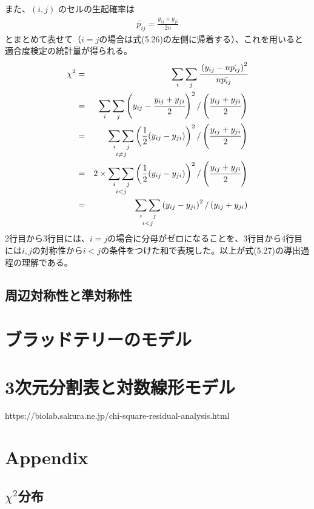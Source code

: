 \documentclass[10pt, a4paper]{ltjsarticle}
\begin{document}
また、$(i,j)$ のセルの生起確率は
\begin{eqnarray}
  \tilde{p_{ij}} = \frac{y_{ij}+y_{ji}}{2n}
\end{eqnarray}
とまとめて表せて（$i=j$の場合は式(5.26)の左側に帰着する）、これを用いると適合度検定の統計量が得られる。
\begin{eqnarray}
  \chi^2 &=& \sum_i\sum_j\cfrac{\left(y_{ij} - n\tilde{p_{ij}}\right)^2}{n\tilde{p_{ij}}} \\
  &=& \sum_i\sum_j \left( y_{ij} - \cfrac{y_{ij}+y_{ji}}{2} \right)^2/\left(\cfrac{y_{ij}+y_{ji}}{2}\right) \\ 
  &=& \mathop{\sum_i\sum_j}_{i\neq j} \left( \frac{1}{2} (y_{ij} - y_{ji}) \right)^2/\left(\cfrac{y_{ij}+y_{ji}}{2}\right) \\ 
  &=& 2 \times \mathop{\sum_i\sum_j}_{i < j} \left( \frac{1}{2} (y_{ij} - y_{ji}) \right)^2/\left(\cfrac{y_{ij}+y_{ji}}{2}\right) \\ 
  &=& \mathop{\sum_i\sum_j}_{i < j} \left( y_{ij} - y_{ji} \right)^2/\left(y_{ij}+y_{ji}\right) 
\end{eqnarray}
2行目から3行目には、$i=j$の場合に分母がゼロになることを、3行目から4行目には$i,j$の対称性から$i<j$の条件をつけた和で表現した。以上が式(5.27)の導出過程の理解である。





\subsection{周辺対称性と準対称性}




\section{ブラッドテリーのモデル}
%
\section{3次元分割表と対数線形モデル}

https://biolab.sakura.ne.jp/chi-square-residual-analysis.html


\newpage

\section{Appendix}

\subsection{$\chi^2$分布}
\end{document}
